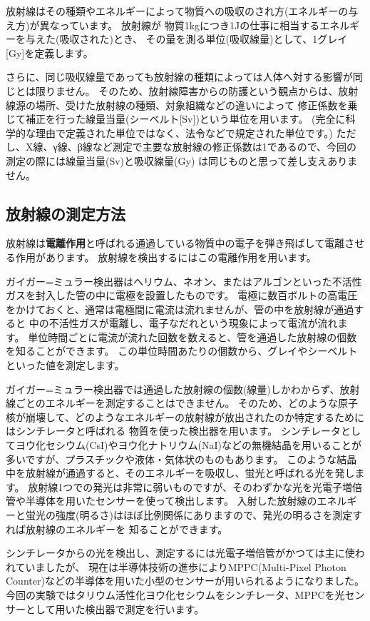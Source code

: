 放射線はその種類やエネルギーによって物質への吸収のされ方(エネルギーの与え方)が異なっています。
放射線が
物質1kgにつき1Jの仕事に相当するエネルギーを与えた(吸収された)とき、
その量を測る単位(吸収線量)として、1グレイ[Gy]を定義します。

さらに、同じ吸収線量であっても放射線の種類によっては人体へ対する影響が同じとは限りません。
そのため、放射線障害からの防護という観点からは、放射線源の場所、受けた放射線の種類、対象組織などの違いによって
修正係数を乗じて補正を行った線量当量(シーベルト[Sv])という単位を用います。
(完全に科学的な理由で定義された単位ではなく、法令などで規定された単位です。)
ただし、X線、γ線、β線など測定で主要な放射線の修正係数は1であるので、今回の測定の際には線量当量(Sv)と吸収線量(Gy)
は同じものと思って差し支えありません。

\subsection{放射線の測定方法}

放射線は{\bf 電離作用}と呼ばれる通過している物質中の電子を弾き飛ばして電離させる作用があります。
放射線を検出するにはこの電離作用を用います。

ガイガー=ミュラー検出器はヘリウム、ネオン、またはアルゴンといった不活性ガスを封入した管の中に電極を設置したものです。
電極に数百ボルトの高電圧をかけておくと、通常は電極間に電流は流れませんが、管の中を放射線が通過すると
中の不活性ガスが電離し、電子なだれという現象によって電流が流れます。
単位時間ごとに電流が流れた回数を数えると、管を通過した放射線の個数を知ることができます。
この単位時間あたりの個数から、グレイやシーベルトといった値を測定します。

ガイガー=ミュラー検出器では通過した放射線の個数(線量)しかわからず、放射線ごとのエネルギーを測定することはできません。
そのため、どのような原子核が崩壊して、どのようなエネルギーの放射線が放出されたのか特定するためにはシンチレータと呼ばれる
物質を使った検出器を用います。
シンチレータとしてヨウ化セシウム(CsI)やヨウ化ナトリウム(NaI)などの無機結晶を用いることが多いですが、プラスチックや液体・気体状のものもあります。
このような結晶中を放射線が通過すると、そのエネルギーを吸収し、蛍光と呼ばれる光を発します。
放射線1つでの発光は非常に弱いものですが、そのわずかな光を光電子増倍管や半導体を用いたセンサーを使って検出します。
入射した放射線のエネルギーと蛍光の強度(明るさ)はほぼ比例関係にありますので、発光の明るさを測定すれば放射線のエネルギーを
知ることができます。

シンチレータからの光を検出し、測定するには光電子増倍管がかつては主に使われていましたが、
現在は半導体技術の進歩によりMPPC(Multi-Pixel Photon Counter)などの半導体を用いた小型のセンサーが用いられるようになりました。
今回の実験ではタリウム活性化ヨウ化セシウムをシンチレータ、MPPCを光センサーとして用いた検出器で測定を行います。

